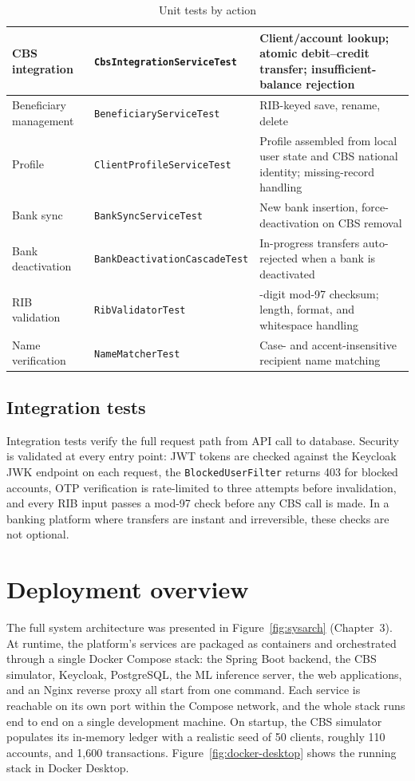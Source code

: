 \documentclass[12pt,a4paper]{report}
\begin{document}
\begin{table}[H]
\begin{tabularx}{\linewidth}{|>{\raggedright\arraybackslash}p{2.3cm}|>{\raggedright\arraybackslash}p{5.0cm}|>{\raggedright\arraybackslash}X|}
\hline
CBS integration & \texttt{CbsIntegrationServiceTest} & Client/account lookup; atomic debit--credit transfer; insufficient-balance rejection \\
\hline
Beneficiary management & \texttt{BeneficiaryServiceTest} & RIB-keyed save, rename, delete \\
\hline
Profile & \texttt{ClientProfileServiceTest} & Profile assembled from local user state and CBS national identity; missing-record handling \\
\hline
Bank sync & \texttt{BankSyncServiceTest} & New bank insertion, force-deactivation on CBS removal \\
\hline
Bank deactivation & \texttt{BankDeactivationCascadeTest} & In-progress transfers auto-rejected when a bank is deactivated \\
\hline
RIB validation & \texttt{RibValidatorTest} & 20-digit mod-97 checksum; length, format, and whitespace handling \\
\hline
Name verification & \texttt{NameMatcherTest} & Case- and accent-insensitive recipient name matching \\
\hline
\end{tabularx}
\caption{Unit tests by action}
\label{tab:unit-tests}
\end{table}

\subsection{Integration tests}

Integration tests verify the full request path from API call to database. Security is validated
at every entry point: JWT tokens are checked against the Keycloak JWK endpoint on each request,
the \texttt{BlockedUserFilter} returns 403 for blocked accounts, OTP verification is
rate-limited to three attempts before invalidation, and every RIB input passes a mod-97 check
before any CBS call is made. In a banking platform where transfers are instant and irreversible,
these checks are not optional.

\section{Deployment overview}
\label{sec:deployment}

The full system architecture was presented in Figure~\ref{fig:sysarch} (Chapter~3). At
runtime, the platform's services are packaged as containers and orchestrated through a
single Docker Compose stack: the Spring Boot backend, the CBS simulator, Keycloak, PostgreSQL,
the ML inference server, the web applications, and an Nginx reverse proxy all start from
one command. Each service is reachable on its own
port within the Compose network, and the whole stack runs end to end on a single development
machine. On startup, the CBS simulator populates its in-memory ledger with a realistic seed of
50 clients, roughly 110 accounts, and 1,600 transactions. Figure~\ref{fig:docker-desktop} shows
the running stack in Docker Desktop.
\end{document}

